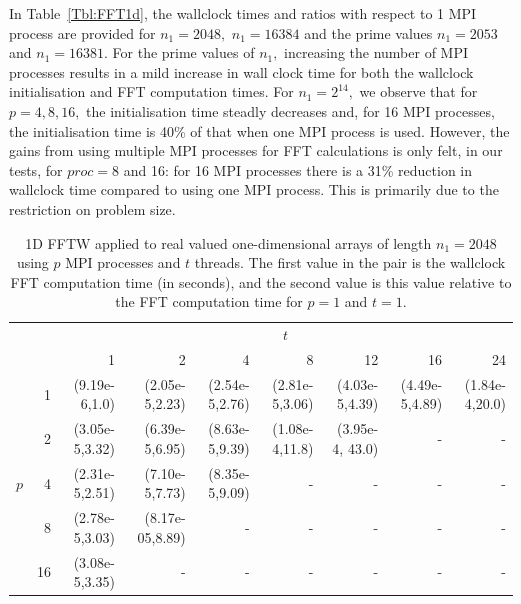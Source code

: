 \documentclass[a4]{article}
\begin{document}
In Table~\ref{Tbl:FFT1d}, the wallclock times and ratios with respect to 1 MPI process are provided for $n_1=2048,$ $n_1=16384$ and the prime values $n_1=2053$ and $n_1=16381.$ For the prime values of $n_1,$ increasing the number of MPI processes results in a mild increase in wall clock time for both the wallclock initialisation and FFT computation times. For $n_1=2^{14},$ we observe that for $p=4,8,16,$ the initialisation time steadly decreases and, for 16 MPI processes, the initialisation time is 40\% of that when one MPI process is used. However, the gains from using multiple MPI processes for FFT calculations is only felt, in our tests, for $proc=8$ and 16: for 16 MPI processes there is a 31\% reduction in wallclock time compared to using one MPI process. This is primarily due to the restriction on problem size. 
\begin{table}
\begin{center}
\begin{tabular}{|rr||r|r|r|r|r|r|r|}
\hline 
   &    & \multicolumn{7}{c}{$t$} \\
   &    & 1           & 2    & 4    & 8    & 12   & 16    & 24  \\ \hline\hline
   & 1  & (9.19e-6,1.0) & (2.05e-5,2.23) & (2.54e-5,2.76) &  (2.81e-5,3.06) &   (4.03e-5,4.39) &   (4.49e-5,4.89) &  (1.84e-4,20.0) \\ \hline
   & 2  & (3.05e-5,3.32) &  (6.39e-5,6.95) &  (8.63e-5,9.39) &  (1.08e-4,11.8) &  (3.95e-4, 43.0) & - & - \\ \hline
$p$& 4  &  (2.31e-5,2.51) &  (7.10e-5,7.73)  & (8.35e-5,9.09) & - & - & - & - \\ \hline
   & 8  & (2.78e-5,3.03) &  (8.17e-05,8.89) & - & - & - & - & - \\ \hline
   & 16 & (3.08e-5,3.35) & - & - & - & - & - & - \\ \hline
\end{tabular}
\caption{1D FFTW applied to real valued one-dimensional arrays of length $n_1=2048$ using $p$ MPI processes and $t$ threads. The first value in the pair is the wallclock FFT computation time (in seconds), and the second value is this value relative to the FFT computation time for $p=1$ and $t=1.$}\label{Tbl:FFT1d2048}
\end{center}
\end{table}
\end{document}
